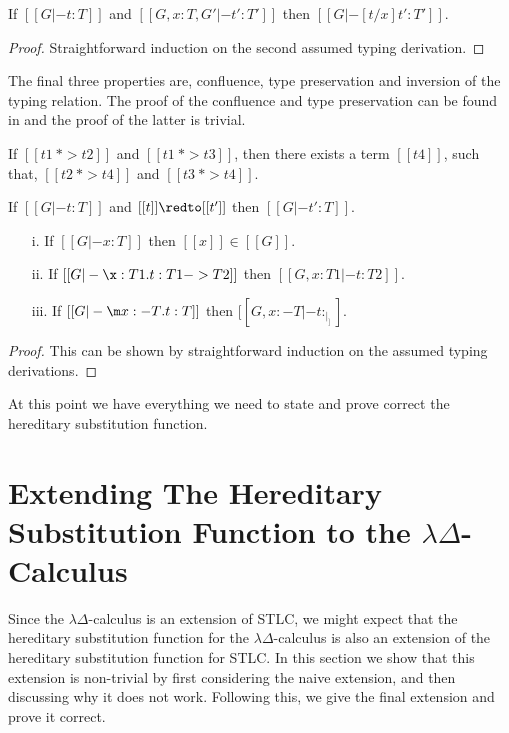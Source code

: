 \begin{lemma}
  \label{lemma:substitution_for_typing}
  If $[[G |- t : T]]$ and $[[G,x:T,G' |- t':T']]$ then $[[G |- [t/x]t':T']]$.
\end{lemma}
\begin{proof}
  Straightforward induction on the second assumed typing derivation.
\end{proof}
\noindent
The final three properties are, confluence, type preservation and inversion of the typing
relation. The proof of the confluence and type preservation can be found in \cite{Rehof:1994}
and the proof of the latter is trivial.

\begin{thm}[Confluence]
  \label{thm:confluence}
  If $[[t1 ~*> t2]]$ and $[[t1 ~*> t3]]$, then there exists a term $[[t4]]$, such that,
  $[[t2 ~*> t4]]$ and $[[t3 ~*> t4]]$.
\end{thm}

\begin{thm}[Preservation]
  \label{thm:preservation}
  If $[[G |- t : T]]$ and $[[t]] \redto [[t']]$ then $[[G |- t' : T]]$.
\end{thm}

\begin{thm}[Inversion]
  \label{theorem:inversion}
  \begin{itemize}
  \item[i.] If $[[G |- x : T]]$ then $[[x]] \in [[G]]$.
  \item[ii.] If $[[G |- \x:T1.t:T1->T2]]$ then $[[G, x:T1 |- t:T2]]$.
  \item[iii.] If $[[G |- \m x:{-T}.t:T]]$ then $[[G, x:{-T} |- t: _|_]]$.
  \end{itemize}
\end{thm}
\begin{proof}
  This can be shown by straightforward induction on the assumed typing derivations.
\end{proof}
\noindent
At this point we have everything we need to state and prove correct
the hereditary substitution function.

\section{Extending The Hereditary Substitution Function to the $\lambda\Delta$-Calculus}
\label{sec:the_hereditary_substitution_function_for_the_ld-calculus}
Since the $\lambda\Delta$-calculus is an extension of STLC, we might expect that 
the hereditary substitution function for the $\lambda\Delta$-calculus is also an extension of the
hereditary substitution function for STLC.  In this section we show that this extension is
non-trivial by first considering the naive extension, and then discussing why it does not work.
Following this, we give the final extension and prove it correct.

